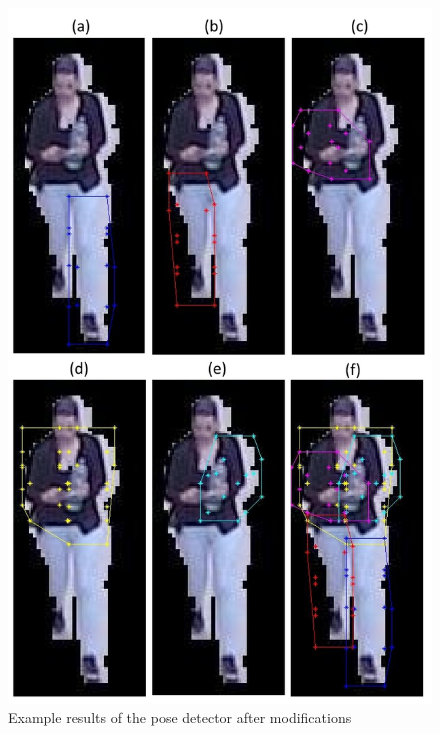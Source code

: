 \documentclass[titlepage,12pt,a4paper,times]{book}
\begin{document}
\begin{figure}[!h]
\centering
\includegraphics[scale=0.63]{images/3_3_fig3_first.jpg}
\caption{Example results of the pose detector after modifications}
\label{fig:erpdm}
\end{figure}
\FloatBarrier
\end{document}
